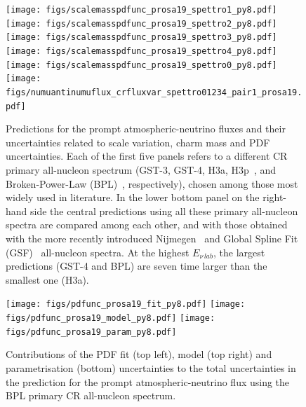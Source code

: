 \begin{figure}
    \centering
    \texttt{[image: figs/scalemasspdfunc\_prosa19\_spettro1\_py8.pdf]}
    \texttt{[image: figs/scalemasspdfunc\_prosa19\_spettro2\_py8.pdf]}
    \texttt{[image: figs/scalemasspdfunc\_prosa19\_spettro3\_py8.pdf]}
    \texttt{[image: figs/scalemasspdfunc\_prosa19\_spettro4\_py8.pdf]}
    \texttt{[image: figs/scalemasspdfunc\_prosa19\_spettro0\_py8.pdf]}
    \texttt{[image: figs/numuantinumuflux\_crfluxvar\_spettro01234\_pair1\_prosa19.pdf]}
  \caption{\label{fig1prompt}  Predictions for the prompt atmospheric-neutrino fluxes and their uncertainties related to scale variation, charm mass and PDF uncertainties. Each of the first five panels refers to a different CR primary all-nucleon spectrum (GST-3, GST-4, H3a, H3p~\cite{Gaisser:2013bla, Gaisser:2011cc},  and Broken-Power-Law (BPL)~\cite{Gaisser:2016uoy}, respectively), chosen among those most widely used in literature. In the lower bottom panel on the right-hand side the central predictions using all these primary all-nucleon spectra are compared among each other, and with those obtained with the more recently introduced Nijmegen~\cite{Thoudam:2016syr} and Global Spline Fit (GSF)~\cite{Dembinski:2017zsh,Schroeder:2019agg} all-nucleon spectra. At the highest $E_{\nu\, lab}$, the largest predictions (GST-4 and BPL) are seven time larger than the smallest one (H3a).}
\end{figure}



\begin{figure}
\centering
    \texttt{[image: figs/pdfunc\_prosa19\_fit\_py8.pdf]}
    \texttt{[image: figs/pdfunc\_prosa19\_model\_py8.pdf]}
    \texttt{[image: figs/pdfunc\_prosa19\_param\_py8.pdf]}
\caption{\label{fig2prompt} Contributions of the PDF fit (top left), model (top right) and parametrisation (bottom) uncertainties to the total uncertainties in the prediction for the prompt atmospheric-neutrino flux using the BPL primary CR all-nucleon spectrum.}  
\end{figure}


